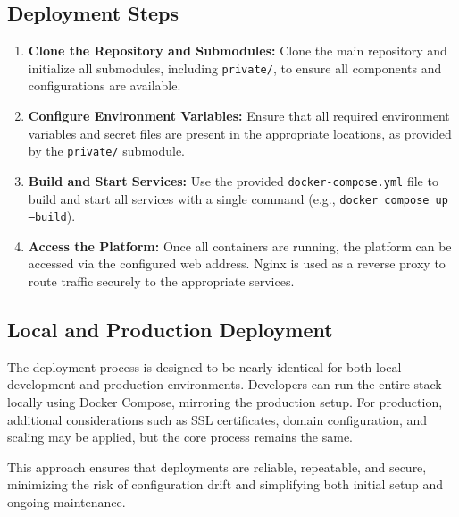 \subsection*{Deployment Steps}
\begin{enumerate}
    \item \textbf{Clone the Repository and Submodules:} Clone the main repository and initialize all submodules, including \texttt{private/}, to ensure all components and configurations are available.
    \item \textbf{Configure Environment Variables:} Ensure that all required environment variables and secret files are present in the appropriate locations, as provided by the \texttt{private/} submodule.
    \item \textbf{Build and Start Services:} Use the provided \texttt{docker-compose.yml} file to build and start all services with a single command (e.g., \texttt{docker compose up --build}).
    \item \textbf{Access the Platform:} Once all containers are running, the platform can be accessed via the configured web address. Nginx is used as a reverse proxy to route traffic securely to the appropriate services.
\end{enumerate}

\subsection*{Local and Production Deployment}
The deployment process is designed to be nearly identical for both local development and production environments. Developers can run the entire stack locally using Docker Compose, mirroring the production setup. For production, additional considerations such as SSL certificates, domain configuration, and scaling may be applied, but the core process remains the same.

This approach ensures that deployments are reliable, repeatable, and secure, minimizing the risk of configuration drift and simplifying both initial setup and ongoing maintenance.
